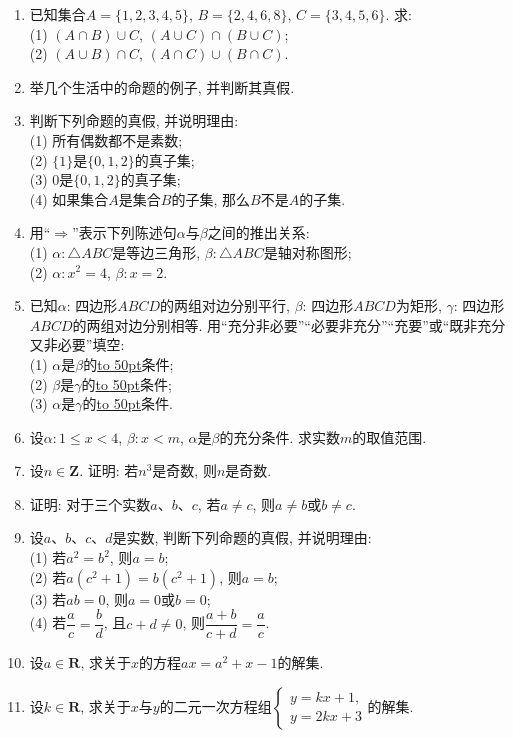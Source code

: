 \documentclass[10pt,a4paper]{article}
\newcommand{\blank}[1]{\underline{\hbox to #1pt{}}}
\begin{document}
\begin{enumerate}[1.]
\item 已知集合$A=\{1, 2, 3, 4, 5\}$, $B=\{2, 4, 6, 8\}$, $C=\{3, 4, 5, 6\}$. 求:\\
(1) $(A\cap B)\cup C$, $(A\cup C)\cap (B\cup C)$;\\
(2) $(A\cup B)\cap C$, $(A\cap C)\cup (B\cap C)$.
\item 举几个生活中的命题的例子, 并判断其真假.
\item 判断下列命题的真假, 并说明理由:\\
(1) 所有偶数都不是素数;\\
(2) $\{1\}$是$\{0, 1, 2\}$的真子集;\\
(3) $0$是$\{0, 1, 2\}$的真子集;\\
(4) 如果集合$A$是集合$B$的子集, 那么$B$不是$A$的子集.
\item 用``$\Rightarrow$''表示下列陈述句$\alpha$与$\beta$之间的推出关系:\\
(1) $\alpha: \triangle ABC$是等边三角形, $\beta: \triangle ABC$是轴对称图形;\\
(2) $\alpha: x^2=4$, $\beta: x=2$.
\item 已知$\alpha$: 四边形$ABCD$的两组对边分别平行, $\beta$: 四边形$ABCD$为矩形, $\gamma$: 四边形$ABCD$的两组对边分别相等. 用``充分非必要''``必要非充分''``充要''或``既非充分又非必要''填空:\\
(1) $\alpha$是$\beta$的\blank{50}条件;\\
(2) $\beta$是$\gamma$的\blank{50}条件;\\
(3) $\alpha$是$\gamma$的\blank{50}条件.
\item 设$\alpha: 1\le x<4$, $\beta: x<m$, $\alpha$是$\beta$的充分条件. 求实数$m$的取值范围.
\item 设$n\in \mathbf{Z}$. 证明: 若$n^3$是奇数, 则$n$是奇数.
\item 证明: 对于三个实数$a$、$b$、$c$, 若$a\ne c$, 则$a\ne b$或$b\ne c$. 
\item 设$a$、$b$、$c$、$d$是实数, 判断下列命题的真假, 并说明理由:\\
(1) 若$a^2=b^2$, 则$a=b$;\\
(2) 若$a(c^2+1)=b(c^2+1)$, 则$a=b$;\\
(3) 若$ab=0$, 则$a=0$或$b=0$;\\
(4) 若$\dfrac ac=\dfrac bd$, 且$c+d\ne 0$, 则$\dfrac{a+b}{c+d}=\dfrac ac$.
\item 设$a\in \mathbf{R}$, 求关于$x$的方程$ax=a^2+x-1$的解集.
\item 设$k\in \mathbf{R}$, 求关于$x$与$y$的二元一次方程组$\begin{cases}y=kx+1, \\ y=2kx+3 \end{cases}$的解集. 

\end{enumerate}
\end{document}
